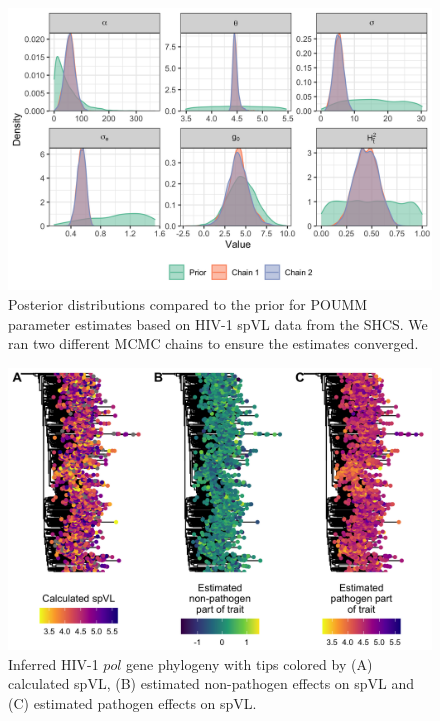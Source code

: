 \documentclass[11pt]{article}
\begin{document}
\begin{doublespace}
\begin{figure}[H]
	\centering
		\includegraphics[width=0.7\linewidth]{figures/poumm_parameter_estimates.png}
		\caption{Posterior distributions compared to the prior for POUMM parameter estimates based on HIV-1 spVL data from the SHCS. We ran two different MCMC chains to ensure the estimates converged.}
\label{fig:poumm-parameters}
\end{figure}

\begin{figure}[H]
\begin{center}
\includegraphics[width = \linewidth]{figures/spvl_on_tree.png}
	\caption{Inferred HIV-1 $pol$ gene phylogeny with tips colored by (A) calculated spVL, (B) estimated non-pathogen effects on spVL and (C) estimated pathogen effects on spVL.}
	\label{fig:spvl-on-tree}
	\end{center}
\end{figure}


\end{doublespace}
\end{document}
